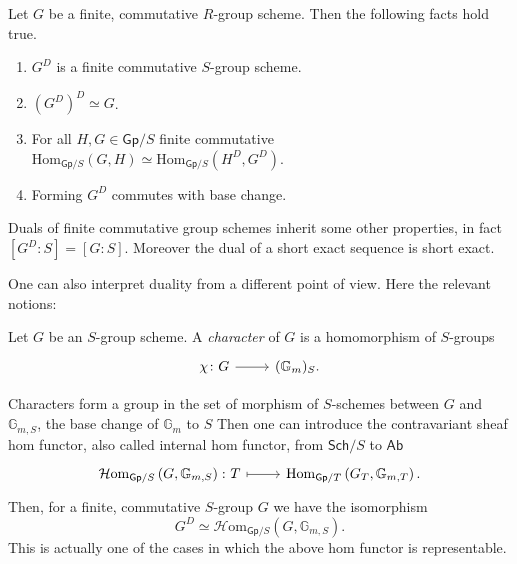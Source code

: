 \begin{thm}\label{thm:CartierDuality}
	Let $G$ be a finite, commutative $R$-group scheme.
	Then the following facts hold true.
\begin{enumerate}
	\item $G^D$ is a finite commutative $S$-group scheme.
	\item $( G^D )^D \simeq G$.
	\item For all $H,G \in \mathsf{Gp}/S$ finite commutative 
	$\mathrm{Hom}_{\mathsf{Gp}/S} \left( G, H \right) \simeq
	\mathrm{Hom}_{\mathsf{Gp}/S} \left( H^D, G^D \right)$.
	\item Forming $G^D$ commutes with base change.
\end{enumerate}
\end{thm}


\begin{rem}[]\label{rem:DualityOtherProperties}
	Duals of finite commutative group schemes inherit some other properties,
	in fact $[G^D : S] = [G : S]$.
	Moreover the dual of a short exact sequence is short exact.
\end{rem}


\noindent
One can also interpret duality from a different point of view.
Here the relevant notions:
\begin{defn}
	Let $G$ be an $S$-group scheme.
	A {\em character} of $G$ is a homomorphism of $S$-groups
	\begin{equation*}
	\begin{tikzcd}[row sep = 0ex
		,/tikz/column 1/.append style={anchor=base east}
		,/tikz/column 2/.append style={anchor=base west}]
		\chi\colon G \arrow[r, "", rightarrow] &
		(\mathbb{G}_m)_S
	.\end{tikzcd}
	\end{equation*} 
\end{defn}


\begin{rem}\label{rem:DualasHomFct}
	Characters form a group in the set of morphism of $S$-schemes
	between $G$ and $\mathbb{G}_{m,S}$, the base change of $\mathbb{G}_m$ to $S$
	Then one can introduce the contravariant sheaf hom functor, also called
	internal hom functor, from $\mathsf{Sch}/S$ to $\mathsf{Ab}$
	\begin{equation*}
	\begin{tikzcd}[row sep = 0ex
		,/tikz/column 1/.append style={anchor=base east}
		,/tikz/column 2/.append style={anchor=base west}]
		\mathcal{H}\mathrm{om}_{\mathsf{Gp}/S} \left( G, \mathbb{G}_{m,S} \right)\colon
		T \arrow[r, "", mapsto] & 
		\mathrm{Hom}_{\mathsf{Gp}/T} \left( G_T, \mathbb{G}_{m,T} \right)
	.\end{tikzcd}
	\end{equation*} 
	Then, for a finite, commutative $S$-group $G$ we have the isomorphism
	\begin{equation*}
		G^D \simeq \mathcal{H}\mathrm{om}_{\mathsf{Gp}/S} \left( G, \mathbb{G}_{m,S} \right)
	.\end{equation*} 
	This is actually one of the cases in which the above hom functor
	is representable.
\end{rem}


